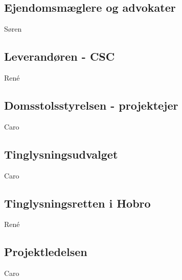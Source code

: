 \documentclass[10pt,a4paper,danish]{article}
\begin{document}
\subsection{Ejendomsmæglere og advokater}
Søren

\subsection{Leverandøren - CSC}
René

\subsection{Domsstolsstyrelsen - projektejer}
Caro

\subsection{Tinglysningsudvalget}
Caro

\subsection{Tinglysningsretten i Hobro}
René

\subsection{Projektledelsen}
Caro
\end{document}
